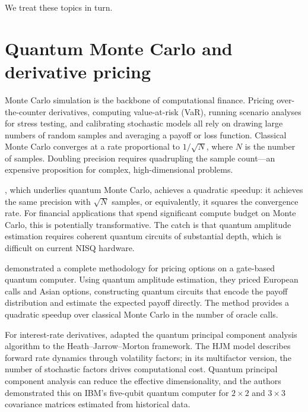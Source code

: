 We treat these topics in turn.

\section{Quantum Monte Carlo and derivative pricing}

Monte Carlo simulation is the backbone of computational finance. Pricing over-the-counter derivatives, computing value-at-risk (VaR), running scenario analyses for stress testing, and calibrating stochastic models all rely on drawing large numbers of random samples and averaging a payoff or loss function. Classical Monte Carlo converges at a rate proportional to $1/\sqrt{N}$, where $N$ is the number of samples. Doubling precision requires quadrupling the sample count---an expensive proposition for complex, high-dimensional problems.

 \citep{egger_quantum_2020}, which underlies quantum Monte Carlo, achieves a quadratic speedup: it achieves the same precision with $\sqrt{N}$ samples, or equivalently, it squares the convergence rate. For financial applications that spend significant compute budget on Monte Carlo, this is potentially transformative. The catch is that quantum amplitude estimation requires coherent quantum circuits of substantial depth, which is difficult on current NISQ hardware.

\citet{stamatopoulos_option_2020} demonstrated a complete methodology for pricing options on a gate-based quantum computer. Using quantum amplitude estimation, they priced European calls and Asian options, constructing quantum circuits that encode the payoff distribution and estimate the expected payoff directly. The method provides a quadratic speedup over classical Monte Carlo in the number of oracle calls.

For interest-rate derivatives, \citet{martin_toward_2021} adapted the quantum principal component analysis algorithm to the Heath--Jarrow--Morton framework. The HJM model describes forward rate dynamics through volatility factors; in its multifactor version, the number of stochastic factors drives computational cost. Quantum principal component analysis can reduce the effective dimensionality, and the authors demonstrated this on IBM's five-qubit quantum computer for $2\times 2$ and $3\times 3$ covariance matrices estimated from historical data.

